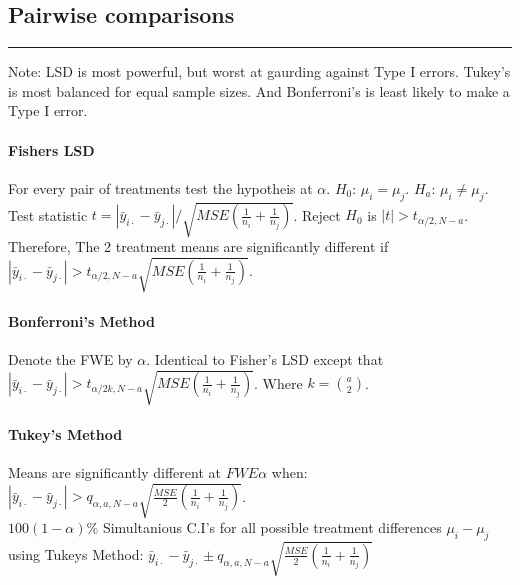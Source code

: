 \documentclass[10pt]{article}
\begin{document}
\subsection*{Pairwise comparisons}
\hrule width 5cm
\vspace{6pt}
Note: LSD is most powerful, but worst at gaurding against Type I errors. Tukey's is most balanced for equal sample sizes. And Bonferroni's is least likely to make a Type I error.
\paragraph{Fishers LSD} For every pair of treatments test the hypotheis at $\alpha$.  $H_0$: $\mu_i = \mu_j$. $H_a$: $\mu_i \neq \mu_j$. \\
Test statistic $t = \left| \bar{y}_{i \cdot} - \bar{y}_{j \cdot} \right| / \sqrt{MSE \left( \frac{1}{n_i} + \frac{1}{n_j} \right)}$. Reject $H_0$ is $\left| t \right| > t_{\alpha/2, N-a}$.\\
Therefore, The 2 treatment means are significantly different if $\left| \bar{y}_{i \cdot} - \bar{y}_{j \cdot} \right| > t_{\alpha/2, N-a} \sqrt{MSE \left( \frac{1}{n_i} + \frac{1}{n_j} \right)}$.


\paragraph{Bonferroni's Method} Denote the FWE by $\alpha$. Identical to Fisher's LSD except that $\left| \bar{y}_{i \cdot} - \bar{y}_{j \cdot} \right| > t_{\alpha/2k, N-a} \sqrt{MSE \left( \frac{1}{n_i} + \frac{1}{n_j} \right)}$.
Where $k = \binom{a}{2}$.

\paragraph{Tukey's Method} Means are significantly different at $FWE \alpha$ when:
$\left| \bar{y}_{i \cdot} - \bar{y}_{j \cdot} \right| > q_{\alpha,a, N-a} \sqrt{\frac{MSE}{2} \left( \frac{1}{n_i} + \frac{1}{n_j} \right)}$. \\
$100(1-\alpha)\%$ Simultanious C.I's for all possible treatment differences $\mu_i - \mu_j$ using Tukeys Method:
$\bar{y}_{i \cdot} - \bar{y}_{j \cdot} \pm q_{\alpha,a,N-a} \sqrt{\frac{MSE}{2} \left( \frac{1}{n_i} + \frac{1}{n_j} \right)}$ 
\end{document}
